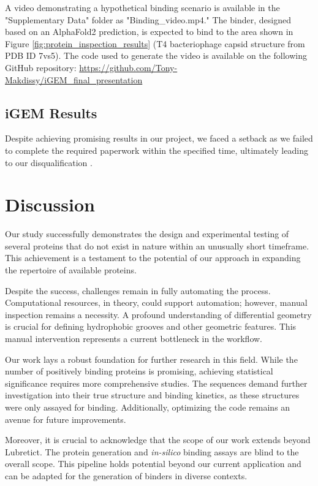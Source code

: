 \documentclass[11pt,a4paper]{article}
\begin{document}
A video demonstrating a hypothetical binding scenario is available in the "Supplementary Data" folder as "Binding\_video.mp4." The binder, designed based on an AlphaFold2 prediction, is expected to bind to the area shown in Figure \ref{fig:protein_inspection_results} (T4 bacteriophage capsid structure from PDB ID 7vs5). The code used to generate the video is available on the following GitHub repository: \url{https://github.com/Tony-Makdissy/iGEM_final_presentation}


\subsection{iGEM Results}

Despite achieving promising results in our project, we faced a setback as we failed to complete the required paperwork within the specified time, ultimately leading to our disqualification \frownie{}. 

\section{Discussion}

Our study successfully demonstrates the design and experimental testing of several proteins that do not exist in nature within an unusually short timeframe. This achievement is a testament to the potential of our approach in expanding the repertoire of available proteins.

Despite the success, challenges remain in fully automating the process. Computational resources, in theory, could support automation; however, manual inspection remains a necessity. A profound understanding of differential geometry is crucial for defining hydrophobic grooves and other geometric features. This manual intervention represents a current bottleneck in the workflow.

Our work lays a robust foundation for further research in this field. While the number of positively binding proteins is promising, achieving statistical significance requires more comprehensive studies. The sequences demand further investigation into their true structure and binding kinetics, as these structures were only assayed for binding. Additionally, optimizing the code remains an avenue for future improvements.

Moreover, it is crucial to acknowledge that the scope of our work extends beyond Lubretict. The protein generation and \emph{in-silico} binding assays are blind to the overall scope. This pipeline holds potential beyond our current application and can be adapted for the generation of binders in diverse contexts.
\end{document}
